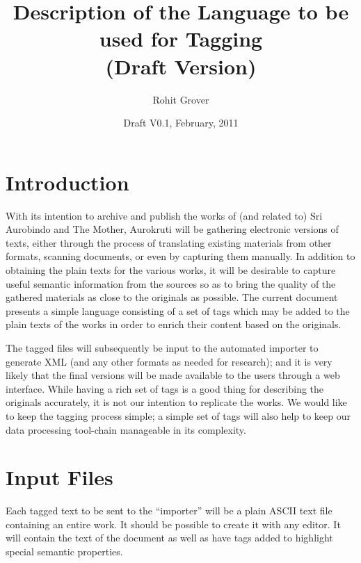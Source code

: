 \documentclass[11pt]{article}
\title{Description of the Language to be used for Tagging\\(Draft Version)}
\author{Rohit Grover}
\date{Draft V0.1, February, 2011}
\begin{document}
\maketitle

\newpage

\section{Introduction}

\noindent With its intention to archive and publish the works of (and
related to) Sri Aurobindo and The Mother, Aurokruti will be gathering
electronic versions of texts, either through the process of
translating existing materials from other formats, scanning documents,
or even by capturing them manually. In addition to obtaining the plain
texts for the various works, it will be desirable to capture useful
semantic information from the sources so as to bring the quality of
the gathered materials as close to the originals as possible. The
current document presents a simple language consisting of a set of
tags which may be added to the plain texts of the works in order to
enrich their content based on the originals.

The tagged files will subsequently be input to the automated importer
to generate XML (and any other formats as needed for research); and it
is very likely that the final versions will be made available to the
users through a web interface. While having a rich set of tags is a
good thing for describing the originals accurately, it is not our
intention to replicate the works. We would like to keep the tagging
process simple; a simple set of tags will also help to keep our data
processing tool-chain manageable in its complexity.



\section{Input Files}

Each tagged text to be sent to the ``importer'' will be a plain ASCII
text file containing an entire work. It should be possible to create
it with any editor. It will contain the text of the document as well
as have tags added to highlight special semantic properties.
\end{document}

